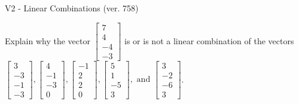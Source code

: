 \begin{exercise}
  \begin{exerciseTitle}V2 - Linear Combinations (ver. 758)\end{exerciseTitle}
  \begin{exerciseStatement}
    Explain why the vector \(\left[\begin{array}{c}
7 \\
4 \\
-4 \\
-3
\end{array}\right]\)  is or is not a linear 
	combination of the vectors \(\left[\begin{array}{c}
3 \\
-3 \\
-1 \\
-3
\end{array}\right] , \left[\begin{array}{c}
4 \\
-1 \\
-3 \\
0
\end{array}\right] , \left[\begin{array}{c}
-1 \\
2 \\
2 \\
0
\end{array}\right] , \left[\begin{array}{c}
5 \\
1 \\
-5 \\
3
\end{array}\right] , \text{ and } \left[\begin{array}{c}
3 \\
-2 \\
-6 \\
3
\end{array}\right]\).
	



\end{exerciseStatement}
\end{exercise}
